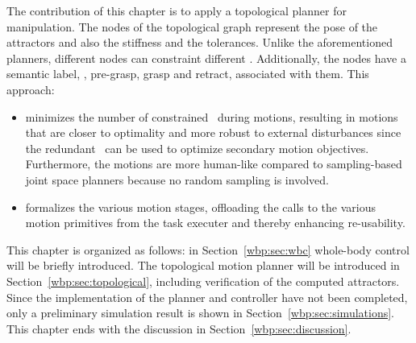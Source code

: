 The contribution of this chapter is to apply a topological planner for manipulation. The nodes of the topological graph represent the pose of the attractors and also the stiffness and the tolerances. 
Unlike the aforementioned planners, different nodes can constraint different \dofs. Additionally, the nodes have a semantic label, \eg, pre-grasp, grasp and retract, associated with them.
This approach:
\begin{itemize}
    \item minimizes the number of constrained \dofs\ during motions, resulting in motions that are closer to optimality and more robust to external disturbances since the redundant \dofs\ can be used to optimize secondary motion objectives. Furthermore, the motions are more human-like compared to sampling-based joint space planners because no random sampling is involved. 
    \item formalizes the various motion stages, offloading the calls to the various motion primitives from the task executer and thereby enhancing re-usability.
\end{itemize}

This chapter is organized as follows: 
in Section~\ref{wbp:sec:wbc} whole-body control will be briefly introduced. The topological motion planner will be introduced in Section~\ref{wbp:sec:topological}, including verification of the computed attractors.
Since the implementation of the planner and controller have not been completed, only a preliminary simulation result is shown in Section~\ref{wbp:sec:simulations}. This chapter ends with the discussion in Section~\ref{wbp:sec:discussion}.

